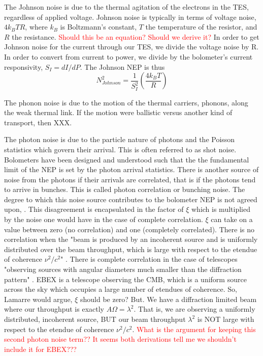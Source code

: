 The Johnson noise is due to the thermal agitation of the electrons in the \ac{TES}, regardless of applied voltage. 
Johnson noise is typically in terms of voltage noise, $4k_{B}TR$, where $k_{B}$ is Boltzmann's constant, $T$ the temperature of the resistor, and $R$ the resistance. 
\textcolor{red}{Should this be an equation? Should we derive it?}
In order to get Johnson noise for the current through our \ac{TES}, we divide the voltage noise by R. 
In order to convert from current to power, we divide by the bolometer's current responsivity, $S_{I} = dI/dP$. 
The Johnson \ac{NEP} is thus
\begin{equation}
N^{2}_{Johnson} =  \frac{1}{S_I^2} (\frac{4k_{B}T}{R})
\label{eq:johnson}
\end{equation}

The phonon noise is due to the motion of the thermal carriers, phonons, along the weak thermal link. 
If the motion were ballistic versus another kind of transport, then XXX. 

The photon noise is due to the particle nature of photons and the Poisson statistics which govern their arrival. 
This is often referred to as shot noise.
Bolometers have been designed and understood such that the the fundamental limit of the \ac{NEP} is set by the photon arrival statistics. 
There is another source of noise from the photons if their arrivals are correlated, that is if the photons tend to arrive in bunches. 
This is called photon correlation or bunching noise. 
The degree to which this noise source contributes to the bolometer \ac{NEP} is not agreed upon, \cite{Richards}. 
This disagreement is encapsulated in the factor of $\xi$ which is multiplied by the noise one would have in the case of complete correlation.
$\xi$ can take on a value between zero (no correlation) and one (completely correlated).
There is no correlation when the "beam is produced by an incoherent source and is uniformly distributed over the beam throughput, which is large with respect to the etendue of coherence $\nu^{2}/c^{2}$" \cite{Lamarre}.
There is complete correlation in the case of telescopes "observing sources with angular diameters much smaller than the diffraction pattern" \cite{Lamarre}. 
\ac{EBEX} is a telescope observing the \ac{CMB}, which is a uniform source across the sky which occupies a large number of etendues of coherence. 
So, Lamarre would argue, $\xi$ should be zero?
But. We have a diffraction limited beam where our throughput is exactly $A\Omega = \lambda^{2}$. That is, we are observing a uniformly distributed, incoherent source, BUT our beam throughput $\lambda^{2}$ is NOT large with respect to the etendue of coherence $\nu^{2}/c^{2}$. 
\textcolor{red}{What is the argument for keeping this second photon noise term?? It seems both derivations tell me we shouldn't include it for \ac{EBEX}???}


